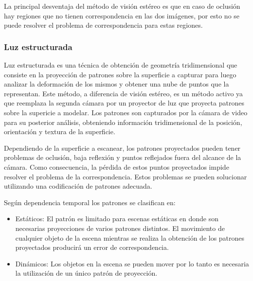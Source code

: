 La principal desventaja del método de visión estéreo es que en caso de oclusión hay regiones que no tienen correspondencia en las dos imágenes, por esto no se puede resolver el problema de correspondencia para estas regiones.

\subsubsection{Luz estructurada}

Luz estructurada es una técnica de obtención de geometría tridimensional que consiste en la proyección de patrones sobre la superficie a capturar para luego analizar la deformación de los mismos y obtener una nube de puntos que la representan. Este método, a diferencia de visión estéreo, es un método activo ya que reemplaza la segunda cámara por un proyector de luz que proyecta patrones sobre la supericie a modelar.
Los patrones son capturados por la cámara de video para su posterior análisis, obteniendo información tridimensional de la posición, orientación y textura de la superficie\cite{SLightPatterns}.

Dependiendo de la superficie a escanear, los patrones proyectados pueden tener problemas de oclusión, baja reflexión y puntos reflejados fuera del alcance de la cámara. Como consecuencia, la pérdida de estos puntos proyectados impide resolver el problema de la correspondencia.
Estos problemas se pueden solucionar utilizando una codificación de patrones adecuada\cite{SLightCorrespondence}.

Según dependencia temporal los patrones se clasifican en:
\begin{itemize}
	\item Estáticos: El patrón es limitado para escenas estáticas en donde son necesarias proyecciones de varios patrones distintos. El movimiento de cualquier objeto de la escena mientras se realiza la obtención de los patrones proyectados producirá un error de correspondencia.
	\item Dinámicos: Los objetos en la escena se pueden mover por lo tanto es necesaria la utilización de un único patrón de proyección.
\end{itemize}

